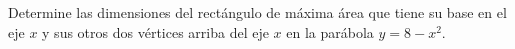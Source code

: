\item Determine las dimensiones del rectángulo de máxima área que tiene su base en el eje $x$ y sus otros dos vértices arriba del eje $x$ en la parábola $y = 8 - x^2$.
